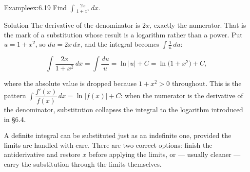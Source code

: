 \documentclass[a4paper,12pt,oneside]{memoir}
\begin{document}
\begin{workedexample}
\begin{envexample}{Example}{ex:6.19}{}
Find \(\displaystyle\int \frac{2x}{1 + x^{2}}\,dx\).
\end{envexample}
\begin{envsolution}{Solution}{}{}
The derivative of the denominator is \(2x\), exactly the numerator. That is the mark of a substitution whose result is a logarithm rather than a power. Put \(u = 1 + x^{2}\), so \(du = 2x\,dx\), and the integral becomes \(\int \tfrac{1}{u}\,du\):

\[ \int \frac{2x}{1 + x^{2}}\,dx = \int \frac{du}{u} = \ln\lvert u\rvert + C = \ln\bigl(1 + x^{2}\bigr) + C, \]

where the absolute value is dropped because \(1 + x^{2} > 0\) throughout. This is the pattern \(\int \dfrac{f'(x)}{f(x)}\,dx = \ln\lvert f(x)\rvert + C\): when the numerator is the derivative of the denominator, substitution collapses the integral to the logarithm introduced in §6.4. \qedmark
\end{envsolution}
\end{workedexample}
A definite integral can be substituted just as an indefinite one, provided the limits are handled with care. There are two correct options: finish the antiderivative and restore \(x\) before applying the limits, or — usually cleaner — carry the substitution through the limits themselves.
\end{document}
